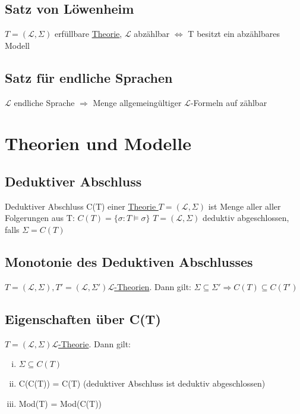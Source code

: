 \documentclass[12pt,a4paper]{article} %
\begin{document}
	\subsection{Satz von Löwenheim}
	$T = (\mathcal{L}, \Sigma)$ erfüllbare \hyperref[Theorie]{Theorie}, $\mathcal{L}$ abzählbar \newline
	$\Leftrightarrow$ T besitzt ein abzählbares Modell
	
	\subsection{Satz für endliche Sprachen}
	$\mathcal{L}$ endliche Sprache $\Rightarrow$ Menge allgemeingültiger $\mathcal{L}$-Formeln auf zählbar 
	
	\newpage
	\section{Theorien und Modelle}
	\subsection{Deduktiver Abschluss}
	Deduktiver Abschluss C(T) einer \hyperref[Theorie]{Theorie $T = (\mathcal{L}, \Sigma)$} ist Menge aller aller Folgerungen aus T: $C(T) = \{\sigma : T \hyperref[Erfullbar]{\vDash} \sigma\}$ \newline
	$T = (\mathcal{L}, \Sigma)$ deduktiv abgeschlossen, falls $\Sigma = C(T)$
	
	\subsection{Monotonie des Deduktiven Abschlusses}
	\hyperref[Theorie]{$T = (\mathcal{L}, \Sigma), T' = (\mathcal{L}, \Sigma') \mathcal{L}$-Theorien}. Dann gilt: $\Sigma \subseteq \Sigma' \Rightarrow C(T) \subseteq C(T')$
	
	\subsection{Eigenschaften über C(T)}
	\hyperref[Theorie]{$T = (\mathcal{L}, \Sigma) \mathcal{L}$-Theorie}. Dann gilt: 
	\begin{enumerate}[(i)]
		\item $\Sigma \subseteq C(T)$
		\item C(C(T)) = C(T) (deduktiver Abschluss ist deduktiv abgeschlossen)
		\item Mod(T) = Mod(C(T))
	\end{enumerate}
\end{document}
